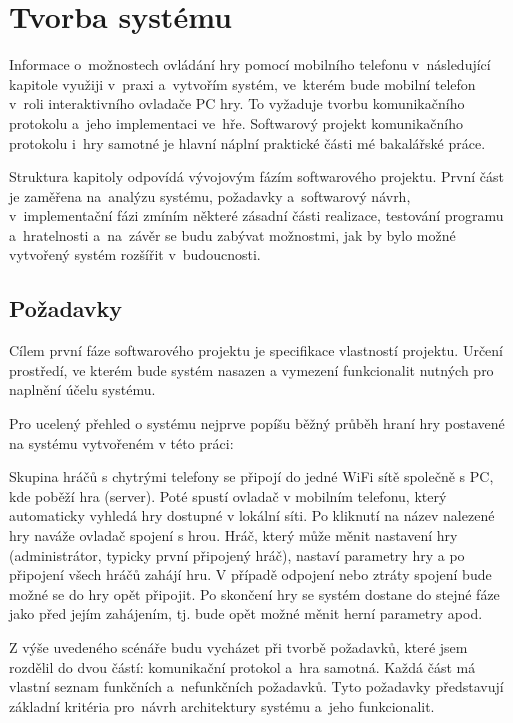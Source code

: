 \documentclass[thesis=B,czech,hidelinks]{FITthesis}[2012/06/26] %
\begin{document}
\chapter{Tvorba systému}
\label{chapter:implementation}

Informace o~možnostech ovládání hry pomocí mobilního telefonu v~následující kapitole využiji v~praxi a~vytvořím systém, ve~kterém bude mobilní telefon v~roli interaktivního ovladače PC hry. To vyžaduje tvorbu komunikačního protokolu a~jeho implementaci ve~hře. Softwarový projekt komunikačního protokolu i~hry samotné je hlavní náplní praktické části mé bakalářské práce.

Struktura kapitoly odpovídá vývojovým fázím softwarového projektu. \cite{si} První část je zaměřena na~analýzu systému, požadavky a~softwarový návrh, v~implementační fázi zmíním některé zásadní části realizace, testování programu a~hratelnosti a~na~závěr se budu zabývat možnostmi, jak by bylo možné vytvořený systém rozšířit v~budoucnosti.

\section{Požadavky}

Cílem první fáze softwarového projektu je specifikace vlastností projektu. Určení prostředí, ve kterém bude systém nasazen a vymezení funkcionalit nutných pro naplnění účelu systému.

Pro ucelený přehled o systému nejprve popíšu běžný průběh hraní hry postavené na systému vytvořeném v této práci:

Skupina hráčů s chytrými telefony se připojí do jedné WiFi sítě společně s PC, kde poběží hra (server). Poté spustí ovladač v mobilním telefonu, který automaticky vyhledá hry dostupné v lokální síti. Po kliknutí na název nalezené hry naváže ovladač spojení s hrou. Hráč, který může měnit nastavení hry (administrátor, typicky první připojený hráč), nastaví parametry hry a po připojení všech hráčů zahájí hru. V případě odpojení nebo ztráty spojení bude možné se do hry opět připojit. Po skončení hry se systém dostane do stejné fáze jako před jejím zahájením, tj. bude opět možné měnit herní parametry apod.

Z výše uvedeného scénáře budu vycházet při tvorbě požadavků, které jsem rozdělil do dvou částí: komunikační protokol a~hra samotná. Každá část má vlastní seznam funkčních a~nefunkčních požadavků. Tyto požadavky představují základní kritéria pro~návrh architektury systému a~jeho funkcionalit.
\end{document}
